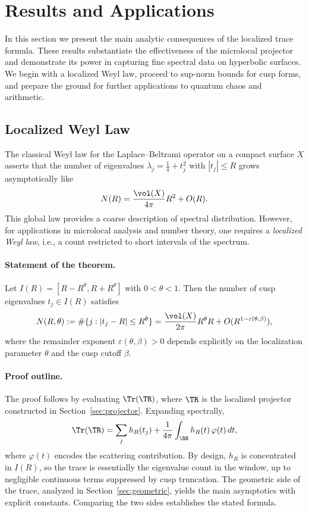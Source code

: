 \section{Results and Applications}\label{sec:results}

In this section we present the main analytic consequences of the localized trace formula. These results substantiate the effectiveness of the microlocal projector and demonstrate its power in capturing fine spectral data on hyperbolic surfaces. We begin with a localized Weyl law, proceed to sup-norm bounds for cusp forms, and prepare the ground for further applications to quantum chaos and arithmetic.

\subsection{Localized Weyl Law}\label{subsec:weyl-law}

The classical Weyl law for the Laplace--Beltrami operator on a compact surface $X$ asserts that the number of eigenvalues $\lambda_j=\tfrac14+t_j^2$ with $|t_j|\le R$ grows asymptotically like
\[
N(R) = \frac{\vol(X)}{4\pi}R^2 + O(R).
\]
This global law provides a coarse description of spectral distribution. However, for applications in microlocal analysis and number theory, one requires a {\em localized Weyl law}, i.e., a count restricted to short intervals of the spectrum.

\paragraph{Statement of the theorem.}
Let $I(R)= [R-R^\theta, R+R^\theta]$ with $0<\theta<1$. Then the number of cusp eigenvalues $t_j\in I(R)$ satisfies
\[
N(R,\theta) := \#\{j: |t_j-R|\le R^\theta\} = \frac{\vol(X)}{2\pi}R^\theta R + O(R^{1-\varepsilon(\theta,\beta)}),
\]
where the remainder exponent $\varepsilon(\theta,\beta)>0$ depends explicitly on the localization parameter $\theta$ and the cusp cutoff $\beta$.

\paragraph{Proof outline.}
The proof follows by evaluating $\Tr(\TR)$, where $\TR$ is the localized projector constructed in Section~\ref{sec:projector}. Expanding spectrally,
\[
\Tr(\TR) = \sum_j h_R(t_j) + \frac{1}{4\pi}\int_\RR h_R(t)\,\varphi(t)\,dt,
\]
where $\varphi(t)$ encodes the scattering contribution. By design, $h_R$ is concentrated in $I(R)$, so the trace is essentially the eigenvalue count in the window, up to negligible continuous terms suppressed by cusp truncation. The geometric side of the trace, analyzed in Section~\ref{sec:geometric}, yields the main asymptotics with explicit constants. Comparing the two sides establishes the stated formula.

